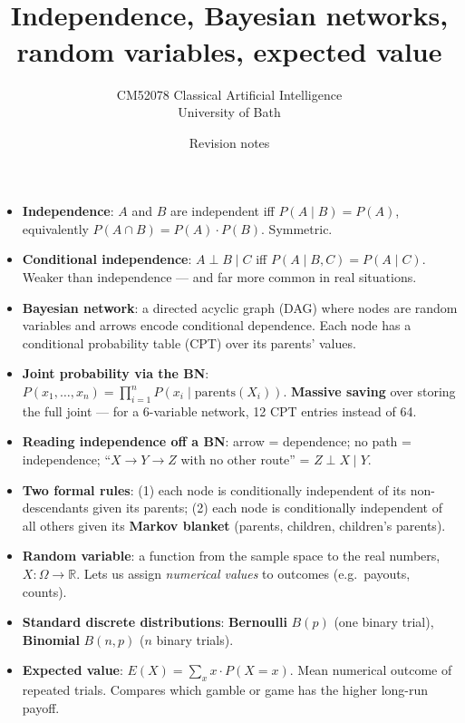 \documentclass[11pt, a4paper]{article}
\title{\vspace{-1cm}{\Huge\bfseries Week 10 — Probabilistic Reasoning} \\[0.4em]{\large Independence, Bayesian networks, random variables, expected value}}
\author{\large CM52078 Classical Artificial Intelligence \\[0.2em]\normalsize University of Bath}
\date{Revision notes}
\begin{document}
\maketitle
\thispagestyle{empty}

\vspace{1em}

\begin{tldrbox}
\begin{itemize}[leftmargin=*]
  \item \textbf{Independence}: $A$ and $B$ are independent iff $P(A \mid B) = P(A)$, equivalently $P(A \cap B) = P(A) \cdot P(B)$. Symmetric.
  \item \textbf{Conditional independence}: $A \perp B \mid C$ iff $P(A \mid B, C) = P(A \mid C)$. Weaker than independence — and far more common in real situations.
  \item \textbf{Bayesian network}: a directed acyclic graph (DAG) where nodes are random variables and arrows encode conditional dependence. Each node has a conditional probability table (CPT) over its parents' values.
  \item \textbf{Joint probability via the BN}: $P(x_1, \dots, x_n) = \prod_{i=1}^n P(x_i \mid \mathrm{parents}(X_i))$. \textbf{Massive saving} over storing the full joint — for a 6-variable network, 12 CPT entries instead of 64.
  \item \textbf{Reading independence off a BN}: arrow = dependence; no path = independence; ``$X \to Y \to Z$ with no other route'' = $Z \perp X \mid Y$.
  \item \textbf{Two formal rules}: (1) each node is conditionally independent of its non-descendants given its parents; (2) each node is conditionally independent of all others given its \textbf{Markov blanket} (parents, children, children's parents).
  \item \textbf{Random variable}: a function from the sample space to the real numbers, $X : \Omega \to \mathbb{R}$. Lets us assign \emph{numerical values} to outcomes (e.g.\ payouts, counts).
  \item \textbf{Standard discrete distributions}: \textbf{Bernoulli} $B(p)$ (one binary trial), \textbf{Binomial} $B(n, p)$ ($n$ binary trials).
  \item \textbf{Expected value}: $E(X) = \sum_x x \cdot P(X = x)$. Mean numerical outcome of repeated trials. Compares which gamble or game has the higher long-run payoff.
\end{itemize}
\end{tldrbox}
\end{document}
